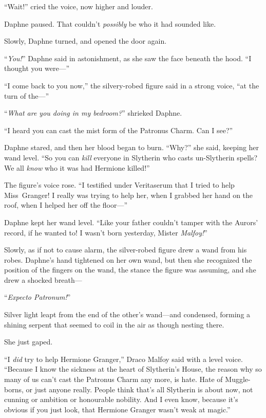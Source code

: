 “Wait!” cried the voice, now higher and louder.

Daphne paused. That couldn’t \emph{possibly} be who it had sounded like.

Slowly, Daphne turned, and opened the door again.

“\emph{You!}” Daphne said in astonishment, as she saw the face beneath the hood. “I thought you were—”

“I come back to you now,” the silvery-robed figure said in a strong voice, “at the turn of the—”

“\emph{What are you doing in my bedroom?}” shrieked Daphne.

“I heard you can cast the mist form of the Patronus Charm. Can I see?”

Daphne stared, and then her blood began to burn. “Why?” she said, keeping her wand level. “So you can \emph{kill} everyone in Slytherin who casts un-Slytherin spells? We all \emph{know} who it was had Hermione killed!”

The figure’s voice rose. “I testified under Veritaserum that I tried to help Miss~Granger! I really was trying to help her, when I grabbed her hand on the roof, when I helped her off the floor—”

Daphne kept her wand level. “Like your father couldn’t tamper with the Aurors’ record, if he wanted to! I wasn’t born yesterday, Mister \emph{Malfoy!}”

Slowly, as if not to cause alarm, the silver-robed figure drew a wand from his robes. Daphne’s hand tightened on her own wand, but then she recognized the position of the fingers on the wand, the stance the figure was assuming, and she drew a shocked breath—

“\emph{Expecto Patronum!}”

Silver light leapt from the end of the other’s wand—and condensed, forming a shining serpent that seemed to coil in the air as though nesting there.

She just gaped.

“I \emph{did} try to help Hermione Granger,” Draco Malfoy said with a level voice. “Because I know the sickness at the heart of Slytherin’s House, the reason why so many of us can’t cast the Patronus Charm any more, is hate. Hate of Muggle-borns, or just anyone really. People think that’s all Slytherin is about now, not cunning or ambition or honourable nobility. And I even know, because it’s obvious if you just look, that Hermione Granger wasn’t weak at magic.”


